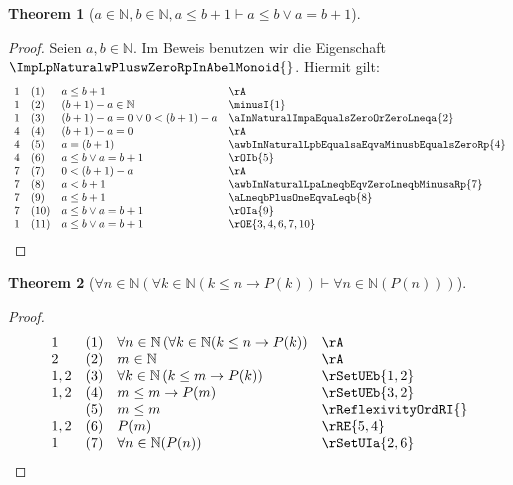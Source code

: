\documentclass{book}
\theoremstyle{plain}
\newtheorem{theorem}{Theorem}
\theoremstyle{remark}
\theoremstyle{definition}
\begin{document}
\label{aInNaturalwbInNaturalwaLeqbPlusOneImpaLeqbOraEqualsbPlusOne}
\begin{theorem}[\(a\in\mathbb{N},b\in\mathbb{N},a\leq b+1\vdash a\leq b\lor a=b+1\)]
\end{theorem}
\begin{proof}
        Seien \(a,b\in\mathbb{N}\). Im Beweis benutzen wir die Eigenschaft \(\ImpLpNaturalwPluswZeroRpInAbelMonoid{}\). Hiermit gilt:
        \[
	\begin{array}{llll}
            1       &  (1) & a\leq b+1 & \rA \\
            1       &  (2) & (b+1)-a\in\mathbb{N} & \minusI{1} \\
            1       &  (3) & (b+1)-a=0\lor 0<(b+1)-a & \aInNaturalImpaEqualsZeroOrZeroLneqa{2} \\
            4       &  (4) & (b+1)-a=0 & \rA \\  
            4       &  (5) & a=(b+1) & \awbInNaturalLpbEqualsaEqvaMinusbEqualsZeroRp{4} \\ 
            4       &  (6) & a\leq b\lor a = b+1 & \rOIb{5}\\
            7       &  (7) & 0<(b+1)-a & \rA\\
            7       &  (8) & a<b+1 & \awbInNaturalLpaLneqbEqvZeroLneqbMinusaRp{7}\\
            7       &  (9) & a\leq b+1 & \aLneqbPlusOneEqvaLeqb{8}\\
            7       &  (10) & a\leq b\lor a=b+1 & \rOIa{9} \\
            1       &  (11) & a\leq b\lor a=b+1 & \rOE{3,4,6,7,10} \\
        \end{array}
	\]
\end{proof}



\label{FanInNaturalLpFakInNaturalLpkLeqnToPLpkRpImpFanInNaturalLpPLpnRpRpRpRp}
\begin{theorem}[\(\forall n\in\mathbb{N}(\forall k\in\mathbb{N}(k\leq n\rightarrow P(k))\vdash \forall n\in\mathbb{N}(P(n)))\)]
\end{theorem}
\begin{proof}
\[
\begin{array}{llll}
1 & (1) & \forall n\in\mathbb{N}\left(\forall k\in\mathbb{N}(k\leq n\rightarrow P(k)\right) & \rA \\
2 & (2) & m\in\mathbb{N} & \rA \\
1,2 & (3) & \forall k\in\mathbb{N}\left(k\leq m\rightarrow P(k)\right) & \rSetUEb{1,2} \\
1,2 & (4) & m\leq m\rightarrow P(m) & \rSetUEb{3,2} \\
    & (5) & m\leq m & \rReflexivityOrdRI{} \\
1,2 & (6) & P(m) & \rRE{5,4} \\
1  & (7) & \forall n\in\mathbb{N}(P(n)) & \rSetUIa{2,6} \\
\end{array}
\]
\end{proof}
\end{document}
